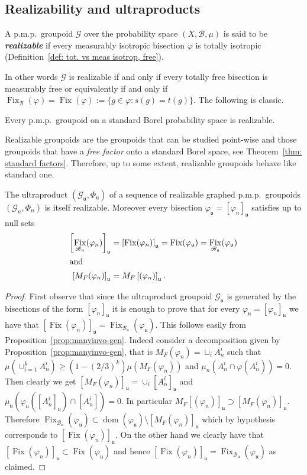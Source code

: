 \documentclass[AHL,Unicode,longabstracts,published]{cedram}
\newcommand{\defin}[1]{\textbf{\emph{#1}}}
\newcommand{\cg}{\mathcal{G}}
\newcommand{\rb}{\mathscr{B}}
\DeclareMathOperator{\dom}{dom}
\DeclareMathOperator{\Fix}{Fix}
\newcommand{\ul}{\mathfrak{u}}
\newcommand{\ph}{\varphi}
\newcommand{\pmp}{p.m.p.\ }
\begin{document}
\subsection{Realizability and ultraproducts}\label{subsect: realizability}

\begin{defi}\label{dfn:realizable}
A \pmp groupoid $\cg$ over the probability space $(X,\rb,\mu)$ is said to be
\defin{realizable} if every measurably isotropic bisection $\ph$ is totally isotropic (Definition~\ref{def: tot. vs meas isotrop, free}).
\end{defi}

In other words $\cg$ is realizable if and only if every totally free bisection is measurably free or equivalently if and only if $\Fix_{\rb}({\ph})=\Fix ({\ph}):= \{g\in \ph: s(g)=t(g)\}$. The following is classic.

\begin{lemm}
Every \pmp groupoid on a standard Borel probability space is realizable.
\end{lemm}

Realizable groupoids are the groupoids that can be studied point-wise and those groupoids that have a \emph{free factor} onto a standard Borel space, see Theorem~\ref{thm: standard factors}. Therefore, up to some extent, realizable groupoids behave like standard one.

\begin{lemm}[Realizability]\label{lem:realizab ultralim and fix}

The ultraproduct $(\cg_\ul, \Phi_\ul)$ of a sequence of realizable graphed \pmp groupoids $(\cg_n, \Phi_n)$ is itself realizable. Moreover every bisection $\ph_\ul=[\ph_n]_\ul$ satisfies up to null sets
\begin{align*}
\left[\Fix_{\rb_n}({\ph_n})\right]_{\ul}&= \left[\Fix({\ph_n})\right]_{\ul}= \Fix (\ph_{\ul})=\Fix_{\rb_\ul}(\ph_\ul)\\
\intertext{and}
\left[M_F(\ph_n)\right]_\ul&=M_F\left[(\ph_n)\right]_\ul.
\end{align*}
\end{lemm}
\begin{proof}
First observe that since the ultraproduct groupoid $\cg_\ul$ is generated by the bisections of the form $[\ph_n]_\ul$ it is enough to prove that for every $\ph_\ul=[\ph_n]_\ul$ we have that $[\Fix({\ph_n})]_{\ul}=\Fix_{\rb_\ul}(\ph_\ul)$. This follows easily from Proposition~\ref{prop:manyinvo-gen}. Indeed consider a decomposition given by Proposition~\ref{prop:manyinvo-gen}, that is $M_F(\ph_n)=\sqcup_i A_n^i$ such that $\mu(\cup_{i=1}^k A_n^i) \geq (1-(2/3)^k) \mu(M_F(\ph_n))$ and $\mu_n(A_n^i\cap \ph(A_n^i))=0$. Then clearly we get $[M_F(\ph_n)]_\ul=\cup_i [A_n^i]_\ul$ and $\mu_\ul(\ph_\ul([A_n^i]_\ul)\cap [A_n^i])=0$. In particular $M_F[(\ph_n)]_\ul\supset [M_F(\ph_n)]_\ul$. Therefore $\Fix_{\rb_\ul}(\ph_\ul)\subset \dom(\ph_\ul)\setminus [M_F(\ph_n)]_\ul$ which by hypothesis corresponds to $[\Fix({\ph_n})]_{\ul}$. On the other hand we clearly have that $[\Fix({\ph_n})]_{\ul}\subset \Fix(\ph_\ul)$ and hence $[\Fix({\ph_n})]_{\ul}=\Fix_{\rb_\ul}(\ph_\ul)$ as claimed.
\end{proof}
\end{document}

